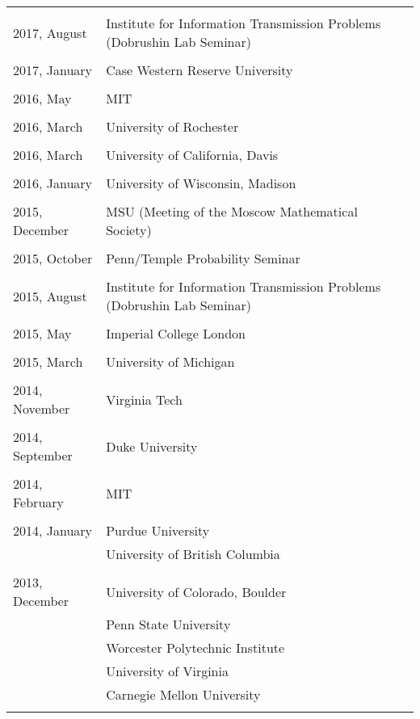 \documentclass[letterpaper,11pt]{article}
\begin{document}
\begin{longtable}{llc}
	\\\\
	2017, August
	& Institute for Information Transmission Problems
	(Dobrushin Lab Seminar)
	\\\\
	2017, January
	& Case Western Reserve University
	\\\\
	2016, May
	& MIT
	\\\\
	2016, March
	& University of Rochester
	\\\\
	2016, March
	& University of California, Davis
	\\\\
	2016, January
	& University of Wisconsin, Madison
	\\\\
	2015, December
	& MSU (Meeting of the Moscow Mathematical Society)
	\\\\
	2015, October
	& Penn/Temple Probability Seminar
	\\\\

	2015, August
	& Institute for Information Transmission Problems
	(Dobrushin Lab Seminar)
	\\\\

	2015, May
	& Imperial College London
	\\\\

	2015, March
	& University of Michigan
	\\\\

	2014, November
	& Virginia Tech\\\\

	2014, September
	& Duke University\\\\

	2014, February
	& MIT\\\\

	2014, January
	  & Purdue University & \hspace{110pt}
	\\& University of British Columbia \\\\

	2013, December
	& University of Colorado, Boulder
	\\&Penn State University\\&Worcester Polytechnic Institute
	\\&University of Virginia\\&
	Carnegie Mellon University \\\\


\end{longtable}
\end{document}
